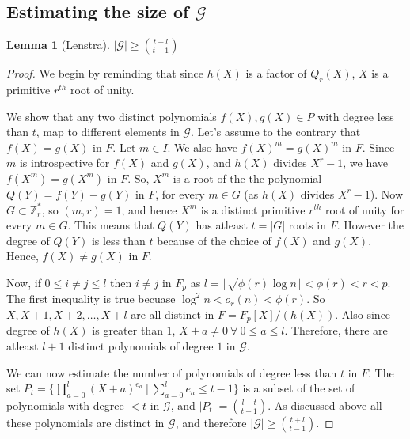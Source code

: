 \documentclass[11pt]{article}
\newtheorem{lemma}[theorem]{Lemma}
\begin{document}
\subsection{Estimating the size of $\mathcal{G}$}
\begin{lemma}
[Lenstra]\label{lemma:GLowerBound}
$|\mathcal{G}| \geq {{t+l} \choose {t-1}}$
\end{lemma}
\begin{proof}
We begin by reminding that since $h(X)$ is a factor of $Q_r(X)$, $X$ is a primitive $r^{th}$ root of unity.

We show that any two distinct polynomials $f(X), g(X) \in P$ with degree less than $t$, map to different elements in $\mathcal{G}$. Let's assume to the contrary that $f(X) = g(X)$ in $F$. Let $m \in I$. We also have $f(X)^m = g(X)^m$ in $F$. Since $m$ is introspective for $f(X)$ and $g(X)$, and $h(X)$ divides $X^r-1$, we have $f(X^m) = g(X^m)$ in $F$. So, $X^m$ is a root of the the polynomial $Q(Y) = f(Y) - g(Y)$ in $F$, for every $m \in G$ (as $h(X)$ divides $X^r-1$). Now $G \subset \mathbb{Z}_r^*$, so $(m,r) = 1$, and hence $X^m$ is a distinct primitive $r^{th}$ root of unity for every $m \in G$. This means that $Q(Y)$ has atleast $t = |G|$ roots in $F$. However the degree of $Q(Y)$ is less than $t$ because of the choice of $f(X)$ and $g(X)$. Hence, $f(X) \neq g(X)$ in $F$.

Now, if $0 \leq i \neq j \leq l$ then $i \neq j$ in $F_p$ as $l = \lfloor \sqrt{\phi(r)} \log n\rfloor < \phi(r) < r < p$. The first inequality is true becuase $\log^2{n} < o_r(n) < \phi(r)$. So $X, X+1, X+2, \dots, X+l$ are all distinct in $F = F_p[X]/(h(X))$. Also since degree of $h(X)$ is greater than $1$, $X+a \neq 0\ \forall \ 0 \leq a \leq l$. Therefore, there are atleast $l+1$ distinct polynomials of degree $1$ in $\mathcal{G}$.

We can now estimate the number of polynomials of degree less than $t$ in $F$. The set $P_t = \{\prod_{a=0}^{l}(X+a)^{e_a}\ | \ \sum_{a=0}^{l}e_a \leq t-1\}$ is a subset of the set of polynomials with degree $<t$ in $\mathcal{G}$, and $|P_t| = {{l+t}\choose{t-1}}$. As discussed above all these polynomials are distinct in $\mathcal{G}$, and therefore $|\mathcal{G}| \geq {{t+l} \choose {t-1}}$.
\end{proof}
\end{document}
